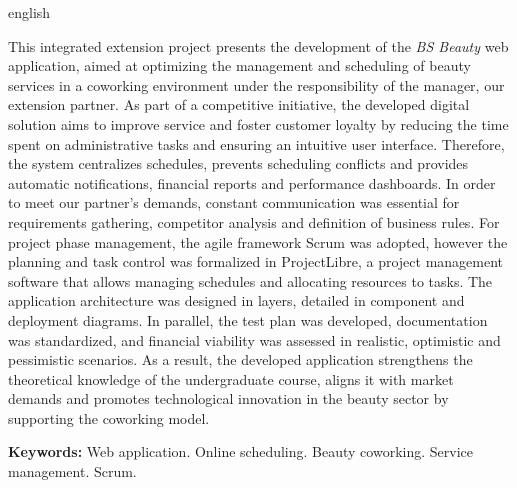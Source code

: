	\begin{resumo}[ABSTRACT]
	\begin{otherlanguage*}{english}
		
		This integrated extension project presents the development of the \emph{BS Beauty} web application, aimed at optimizing the management and scheduling of beauty services in a coworking environment under the responsibility of the manager, our extension partner. As part of a competitive initiative, the developed digital solution aims to improve service and foster customer loyalty by reducing the time spent on administrative tasks and ensuring an intuitive user interface. Therefore, the system centralizes schedules, prevents scheduling conflicts and provides automatic notifications, financial reports and performance dashboards. In order to meet our partner’s demands, constant communication was essential for requirements gathering, competitor analysis and definition of business rules. For project phase management, the agile framework Scrum was adopted, however the planning and task control was formalized in ProjectLibre, a project management software that allows managing schedules and allocating resources to tasks. The application architecture was designed in layers, detailed in component and deployment diagrams. In parallel, the test plan was developed, documentation was standardized, and financial viability was assessed in realistic, optimistic and pessimistic scenarios. As a result, the developed application strengthens the theoretical knowledge of the undergraduate course, aligns it with market demands and promotes technological innovation in the beauty sector by supporting the coworking model.
		
		\textbf{Keywords:} Web application. Online scheduling. Beauty coworking. Service management. Scrum.
		
	\end{otherlanguage*}
\end{resumo}